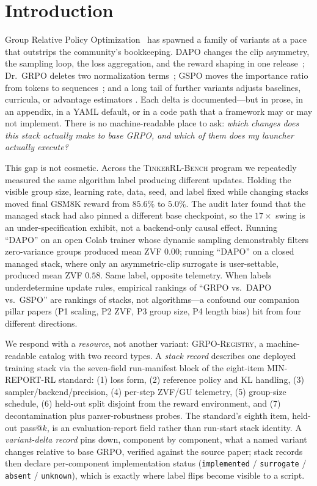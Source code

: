 \documentclass{article}
\newcommand{\ours}{\textsc{TinkerRL-Bench}}
\begin{document}
 \section{Introduction}
\label{sec:p6-intro}
Group Relative Policy Optimization~\citep{shao2024deepseekmath, guo2025deepseekr1}
has spawned a family of variants at a pace that outstrips the community's
bookkeeping. DAPO changes the clip asymmetry, the sampling loop, the loss
aggregation, and the reward shaping in one release~\citep{yu2025dapo}; Dr.~GRPO
deletes two normalization terms~\citep{tong2025drgrpo}; GSPO moves the
importance ratio from tokens to sequences~\citep{qwen2025gspo}; and a long tail
of further variants adjusts baselines, curricula, or advantage estimators
\citep{lin2025cppo, nan2025ngrpo, zhang2025scaffgrpo, mcgrpo2025, gift2025,
liu2026gdpo, ichihara2025mogrpo, lu2025grpolead, bytedance2025vapo,
le2025rlzvp}. Each delta is documented---but in prose, in
an appendix, in a YAML default, or in a code path that a framework may or may
not implement. There is no machine-readable place to ask: \emph{which changes
does this stack actually make to base GRPO, and which of them does my launcher
actually execute?}

This gap is not cosmetic. Across the \ours{} program we repeatedly measured the
same algorithm label producing different updates. Holding the visible group
size, learning rate, data, seed, and label fixed while changing stacks moved
final GSM8K reward from $85.6\%$ to $5.0\%$. The audit later found that the
managed stack had also pinned a different base checkpoint, so the $17\times$
swing is an under-specification exhibit, not a backend-only causal effect.
Running ``DAPO'' on an open Colab trainer whose dynamic sampling
demonstrably filters zero-variance groups produced mean ZVF $0.00$; running
``DAPO'' on a closed managed stack, where only an asymmetric-clip surrogate is
user-settable, produced mean ZVF $0.58$. Same label, opposite telemetry. When
labels underdetermine update rules, empirical rankings of ``GRPO vs.\ DAPO
vs.\ GSPO'' are rankings of stacks, not algorithms---a confound our companion
pillar papers (P1 scaling, P2 ZVF, P3 group size, P4 length bias) hit from four
different directions.

We respond with a \emph{resource}, not another variant:
\textsc{GRPO-Registry}, a machine-readable catalog with two record types.
A \emph{stack record} describes one deployed training stack via the seven-field
run-manifest block of the eight-item MIN-REPORT-RL standard: (1) loss form, (2) reference policy
and KL handling, (3) sampler/backend/precision, (4) per-step ZVF/GU telemetry,
(5) group-size schedule, (6) held-out split disjoint from the reward
environment, and (7) decontamination plus parser-robustness probes. The
standard's eighth item, held-out pass@$k$, is an evaluation-report field rather
than run-start stack identity. A
\emph{variant-delta record} pins down, component by component, what a named
variant changes relative to base GRPO, verified against the source paper; stack
records then declare per-component implementation status
(\texttt{implemented} / \texttt{surrogate} / \texttt{absent} / \texttt{unknown}),
which is exactly where label flips become visible to a script.
\end{document}
